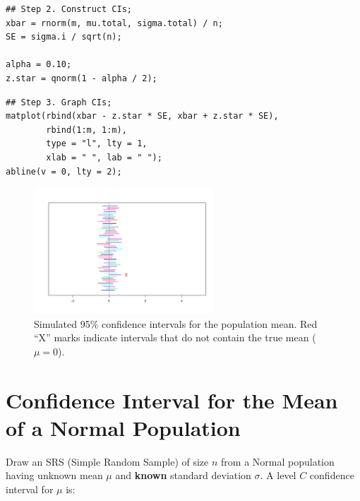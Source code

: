 \vspace{1em}
\begin{tcolorbox}[colback=gray!10, colframe=black!45, arc=2mm]
\begin{verbatim}
## Step 2. Construct CIs;
xbar = rnorm(m, mu.total, sigma.total) / n;
SE = sigma.i / sqrt(n);

alpha = 0.10;
z.star = qnorm(1 - alpha / 2);
\end{verbatim}
\end{tcolorbox}

\vspace{1em}
\begin{tcolorbox}[colback=gray!10, colframe=black!45, arc=2mm]
\begin{verbatim}
## Step 3. Graph CIs;
matplot(rbind(xbar - z.star * SE, xbar + z.star * SE),
        rbind(1:m, 1:m),
        type = "l", lty = 1,
        xlab = " ", lab = " ");
abline(v = 0, lty = 2);
\end{verbatim}
\end{tcolorbox}

\begin{figure}[H]
  \centering
  \includegraphics[width=0.6\textwidth]{Section6/images/confidence_intervals.pdf}
\captionsetup{skip=-5pt}
  \caption{Simulated 95\% confidence intervals for the population mean. Red “X” marks indicate intervals that do not contain the true mean (\( \mu = 0 \)).}
\end{figure}


\vspace{2em}

\section*{Confidence Interval for the Mean of a Normal Population}

Draw an SRS (Simple Random Sample) of size $n$ from a Normal population having unknown mean $\mu$ and \textbf{known} standard deviation $\sigma$. A level $C$ confidence interval for $\mu$ is:

